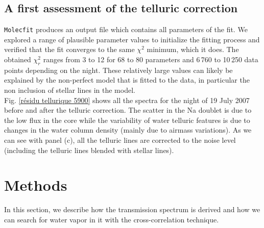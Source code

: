 \documentclass{aa}
\begin{document}
	\subsection{A first assessment of the telluric correction}
\texttt{Molecfit}  produces an output file which contains all parameters of the fit. We explored a range of plausible parameter values to initialize the fitting process and verified that the fit converges to the same $\chi^{2}$ minimum, which it does. The obtained $\chi^{2}_{r}$ ranges from 3 to 12  for  68 to 80 parameters and 6\,760 to 10\,250 data points depending on the night. These relatively large values can likely be explained by the non-perfect model that is fitted to the data, in particular the non inclusion of stellar lines in the model.\\
Fig. \ref{résidu tellurique 5900} shows all the spectra for the night of 19 July 2007  before and after the telluric correction. The scatter in the Na doublet is due to the low flux in the core while the variability of water telluric features is due to changes in the water column density (mainly due to airmass variations). As we can see with panel (c), all the telluric lines are corrected to the noise level (including the telluric lines blended with stellar lines). 




\section{Methods}
\label{method}
In this section, we describe how the transmission spectrum is derived and how we can search for water vapor in it with the cross-correlation technique.
\end{document}
